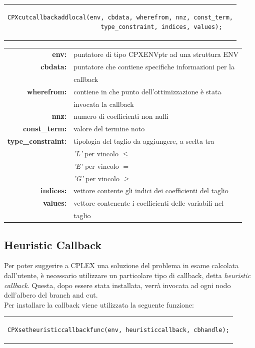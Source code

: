 \begin{center}
\begin{tabular}{c}
\begin{lstlisting}[linewidth=380pt, basicstyle=\footnotesize\sffamily,]  
CPXcutcallbackaddlocal(env, cbdata, wherefrom, nnz, const_term,
                       type_constraint, indices, values);
\end{lstlisting}
\end{tabular}
\end{center}
\begin{table}[h]
\centering
\begin{tabular}{rl}
\textbf{env:} & {puntatore di tipo CPXENVptr ad una struttura ENV}\\
\textbf{cbdata:} & {puntatore che contiene specifiche informazioni per la}\\
&{callback}\\
\textbf{wherefrom:} & {contiene in che punto dell'ottimizzazione è stata} \\ 
&{invocata la callback}\\
\textbf{nnz:} & {numero di coefficienti non nulli} \\
\textbf{const\_term:} & {valore del termine noto} \\
\textbf{type\_constraint:} & {tipologia del taglio da aggiungere, a scelta tra} \\
&{\textit{'L'} per vincolo $\leq$}\\
&{\textit{'E'} per vincolo $=$}\\
&{\textit{'G'} per vincolo $\geq$}\\
\textbf{indices:} & {vettore contente gli indici dei coefficienti del taglio} \\
\textbf{values:} & {vettore contenente i coefficienti delle variabili nel} \\
&{taglio}\\
\end{tabular}
\end{table}
\subsection{Heuristic Callback}
Per poter suggerire a CPLEX una soluzione del problema in esame calcolata dall'utente, è necessario utilizzare un particolare tipo di callback, detta \textit{heuristic callback}. Questa, dopo essere stata installata, verrà invocata ad ogni nodo dell'albero del branch and cut.\\
Per installare la callback viene utilizzata la seguente funzione:
\begin{center}
\begin{tabular}{c}
\begin{lstlisting}[linewidth=382pt, basicstyle=\footnotesize\sffamily,]    
CPXsetheuristiccallbackfunc(env, heuristiccallback, cbhandle);
\end{lstlisting}
\end{tabular}
\end{center}

